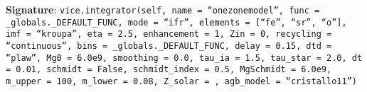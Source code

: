 \documentclass{report}
\begin{document}
\par\null\par
\textbf{Signature}: \texttt{vice.integrator(self, name = ``onezonemodel'', 
func = \_globals.\_DEFAULT\_FUNC, \newline mode = ``ifr'', elements = 
[``fe'', ``sr'', ``o''], imf = ``kroupa'', eta = 2.5, enhancement = 1, 
\newline Zin = 0, recycling = ``continuous'', bins = \_globals.\_DEFAULT\_FUNC, 
delay = 0.15, dtd = \newline``plaw'', Mg0 = 6.0e9, smoothing = 0.0, 
tau\_ia = 1.5, tau\_star = 2.0, dt = 0.01, schmidt = \newline False, 
schmidt\_index = 0.5, MgSchmidt = 6.0e9, m\_upper = 100, m\_lower = 0.08, 
Z\_solar = , agb\_model = ``cristallo11'')}
\end{document}
